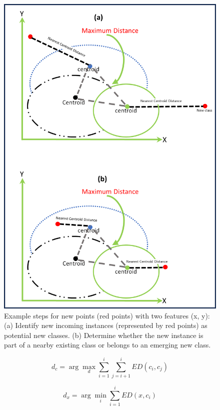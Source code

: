 \begin{figure}[!ht]
\begin{minipage}{0.48\textwidth}
        \includegraphics[width=\linewidth]{5_Emerging/images/scenario2.png}
        \caption{Example steps for new points (red points) with two features (x, y): (a) Identify new incoming instances (represented by red points) as potential new classes. (b) Determine whether the new instance is part of a nearby existing class or belongs to an emerging new class.}
        \label{fig:scenario2}
    \end{minipage}
\end{figure}



\begin{equation}
	\label{eq:equation_1}
	d_c = \arg\max_d \sum_{i=1}^{i} \sum_{j=i+1}^{i}  ED(c_i, c_j)
\end{equation}

\begin{equation}
	\label{eq:equation_2}
	d_x = \arg\min_i \sum_{i=1}^{i} ED(x, c_i)
\end{equation}


